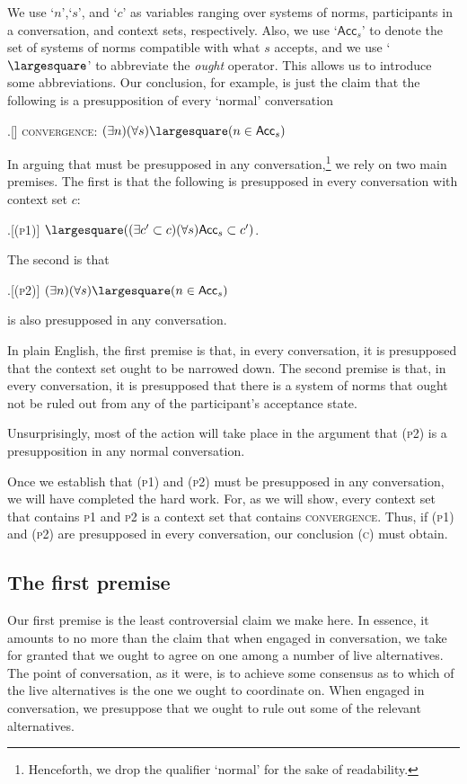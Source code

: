 \documentclass[11pt,article,oneside]{memoir}
\newcommand{\ought}{\largesquare}
\begin{document}
We use `$n$',`$s$', and `$c$' as variables ranging over systems of norms, participants in a conversation, and context sets, respectively. Also, we use `$\mathsf{Acc}_s$' to denote the set of systems of norms compatible with what $s$ accepts, and we use `$\ought$' to abbreviate the \emph{ought} operator. This allows us to introduce some abbreviations. Our conclusion, for example, is just the claim that the following is a presupposition of every `normal' conversation

\ex.[] \textsc{convergence}: $(\exists n)(\forall s) \ought (n \in \mathsf{Acc}_s)$


In arguing that \Last must be presupposed in any conversation,\footnote{Henceforth, we drop the qualifier `normal' for the sake of readability.} we rely on two main premises. The first is that the following is presupposed in every conversation with context set $c$:

\ex.[(\textsc{p1})] $\ought ((\exists c' \subset c)(\forall s)\mathsf{Acc}_s \subset c')$.

The second is that 

\ex.[(\textsc{p2})] $(\exists n)(\forall s)\ought(n \in \mathsf{Acc}_s)$

is also presupposed in any conversation. 

In plain English, the first premise is that, in every conversation, it is presupposed that the context set ought to be narrowed down. The second premise is that, in every conversation, it is presupposed that there is a system of norms that ought not be ruled out from any of the participant's acceptance state. 

Unsurprisingly, most of the action will take place in the argument that (\textsc{p2}) is a presupposition in any normal conversation. 

Once we establish that (\textsc{p1}) and (\textsc{p2}) must be presupposed in any conversation, we will have completed the hard work. For, as we will show, every context set that contains \textsc{p1} and \textsc{p2} is a context set that contains \textsc{convergence}. Thus, if (\textsc{p1}) and (\textsc{p2}) are presupposed in every conversation, our conclusion (\textsc{c}) must obtain. 

\subsection{The first premise}

Our first premise is the least controversial claim we make here. In essence, it amounts to no more than the claim that when engaged in conversation, we take for granted that we ought to agree on one among a number of live alternatives. The point of conversation, as it were, is to achieve some consensus as to which of the live alternatives is the one we ought to coordinate on. When engaged in conversation, we presuppose that we ought to rule out some of the relevant alternatives. 
\end{document}
